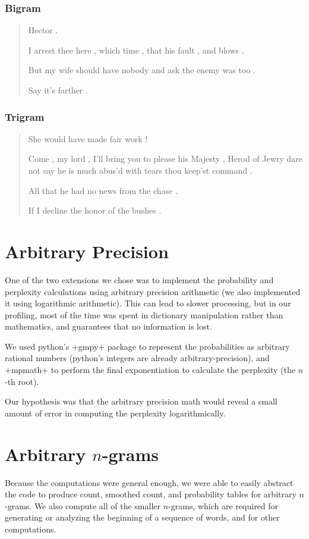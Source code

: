 \documentclass{article}
\begin{document}
		\subsubsection*{Bigram}
			
			\begin{quote}
			
			Hector .

			I arrest thee here , which time , that his fault , and blows .

			But my wife should have nobody and ask the enemy was too .

			Say it's farther .

			\end{quote}

		\subsubsection*{Trigram}

			\begin{quote}
			
			She would have made fair work !

			Come , my lord , I'll bring you to please his Majesty , Herod of
			Jewry dare not say he is much abus'd with tears thou keep'st command
			.

			All that he had no news from the chase .

			If I decline the honor of the bushes .

			\end{quote}
	
	\section*{Arbitrary Precision}

		One of the two extensions we chose was to implement the probability and
		perplexity calculations using arbitrary precision arithmetic (we also
		implemented it using logarithmic arithmetic).  This can lead to slower
		processing, but in our profiling, most of the time was spent in
		dictionary manipulation rather than mathematics, and guarantees that no
		information is lost.

		We used python's +gmpy+ package to represent the probabilities as
		arbitrary rational numbers (python's integers are already
		arbitrary-precision), and +mpmath+ to perform the final exponentiation
		to calculate the perplexity (the $n$-th root).

		Our hypothesis was that the arbitrary precision math would reveal a
		small amount of error in computing the perplexity logarithmically.

	\section*{Arbitrary $n$-grams}
	
		Because the computations were general enough, we were able to easily
		abstract the code to produce count, smoothed count, and probability
		tables for arbitrary $n$-grams.  We also compute all of the smaller
		$n$-grams, which are required for generating or analyzing the beginning
		of a sequence of words, and for other computations.
\end{document}
